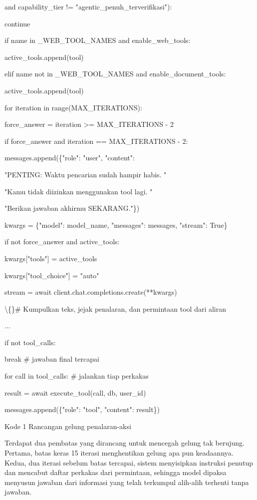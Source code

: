 \documentclass[12pt,a4paper]{article}
\begin{document}
and capability\_tier != "agentic\_penuh\_terverifikasi"):

continue

if name in \_WEB\_TOOL\_NAMES and enable\_web\_tools:

active\_tools.append(tool)

elif name not in \_WEB\_TOOL\_NAMES and enable\_document\_tools:

active\_tools.append(tool)

for iteration in range(MAX\_ITERATIONS):

force\_answer = iteration \textgreater{}= MAX\_ITERATIONS - 2

if force\_answer and iteration == MAX\_ITERATIONS - 2:

messages.append(\{"role": "user", "content":

"PENTING: Waktu pencarian sudah hampir habis. "

"Kamu tidak diizinkan menggunakan tool lagi. "

"Berikan jawaban akhirmu SEKARANG."\})

kwargs = \{"model": model\_name, "messages": messages, "stream": True\}

if not force\_answer and active\_tools:

kwargs{[}"tools"{]} = active\_tools

kwargs{[}"tool\_choice"{]} = "auto"

stream = await client.chat.completions.create(**kwargs)

\textbackslash\{\}\# Kumpulkan teks, jejak penalaran, dan permintaan tool dari aliran

...

if not tool\_calls:

break                     \# jawaban final tercapai

for call in tool\_calls:       \# jalankan tiap perkakas

result = await execute\_tool(call, db, user\_id)

messages.append(\{"role": "tool", "content": result\})

Kode 1	Rancangan gelung penalaran-aksi

Terdapat dua pembatas yang dirancang untuk mencegah gelung tak berujung. Pertama, batas keras 15 iterasi menghentikan gelung apa pun keadaannya. Kedua, dua iterasi sebelum batas tercapai, sistem menyisipkan instruksi penutup dan mencabut daftar perkakas dari permintaan, sehingga model dipaksa menyusun jawaban dari informasi yang telah terkumpul alih-alih terhenti tanpa jawaban.
\end{document}
